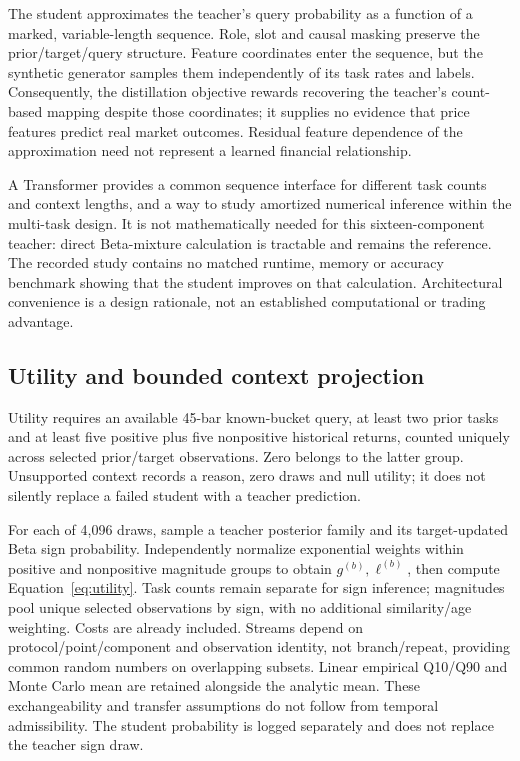 The student approximates the teacher's query probability as a function
of a marked, variable-length sequence. Role, slot and causal masking
preserve the prior/target/query structure. Feature coordinates enter the
sequence, but the synthetic generator samples them independently of its
task rates and labels. Consequently, the distillation objective rewards
recovering the teacher's count-based mapping despite those coordinates;
it supplies no evidence that price features predict real market outcomes.
Residual feature dependence of the approximation need not represent a
learned financial relationship.

A Transformer provides a common sequence interface for different task
counts and context lengths, and a way to study amortized numerical
inference within the multi-task design. It is not mathematically needed
for this sixteen-component teacher: direct Beta-mixture calculation is
tractable and remains the reference. The recorded study contains no
matched runtime, memory or accuracy benchmark showing that the student
improves on that calculation. Architectural convenience is a design
rationale, not an established computational or trading advantage.

\subsection{Utility and bounded context projection}\label{s:2fde9b3e9d8b15d2}
Utility requires an available 45-bar known-bucket query, at least two
prior tasks and at least five positive plus five nonpositive historical
returns, counted uniquely across selected prior/target observations.
Zero belongs to the latter group. Unsupported context records a reason,
zero draws and null utility; it does not silently replace a failed
student with a teacher prediction.

For each of 4,096 draws, sample a teacher posterior family and its
target-updated Beta sign probability. Independently normalize exponential
weights within positive and nonpositive magnitude groups to obtain
$g^{(b)},\ell^{(b)}$, then compute Equation~\ref{eq:utility}. Task counts
remain separate for sign inference; magnitudes pool unique selected
observations by sign, with no additional similarity/age weighting.
Costs are already included. Streams depend on protocol/point/component
and observation identity, not branch/repeat, providing common random
numbers on overlapping subsets. Linear empirical Q10/Q90 and Monte Carlo
mean are retained alongside the analytic mean. These exchangeability
and transfer assumptions do not follow from temporal admissibility.
The student probability is logged separately and does not replace the
teacher sign draw.


